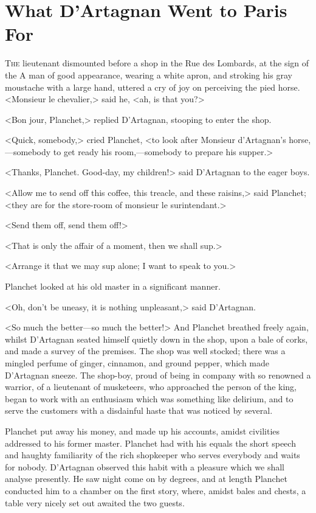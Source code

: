 \chapter{What D'Artagnan Went to Paris For}

\lettrine{T}{he} lieutenant dismounted before a shop in the Rue des Lombards, at the sign of the  A man of good appearance, wearing a white apron, and stroking his gray moustache with a large hand, uttered a cry of joy on perceiving the pied horse. <Monsieur le chevalier,> said he, <ah, is that you?>

<Bon jour, Planchet,> replied D'Artagnan, stooping to enter the shop.

<Quick, somebody,> cried Planchet, <to look after Monsieur d'Artagnan's horse,—somebody to get ready his room,—somebody to prepare his supper.>

<Thanks, Planchet. Good-day, my children!> said D'Artagnan to the eager boys.

<Allow me to send off this coffee, this treacle, and these raisins,> said Planchet; <they are for the store-room of monsieur le surintendant.>

<Send them off, send them off!>

<That is only the affair of a moment, then we shall sup.>

<Arrange it that we may sup alone; I want to speak to you.>

Planchet looked at his old master in a significant manner.

<Oh, don't be uneasy, it is nothing unpleasant,> said D'Artagnan.

<So much the better—so much the better!> And Planchet breathed freely again, whilst D'Artagnan seated himself quietly down in the shop, upon a bale of corks, and made a survey of the premises. The shop was well stocked; there was a mingled perfume of ginger, cinnamon, and ground pepper, which made D'Artagnan sneeze. The shop-boy, proud of being in company with so renowned a warrior, of a lieutenant of musketeers, who approached the person of the king, began to work with an enthusiasm which was something like delirium, and to serve the customers with a disdainful haste that was noticed by several.

Planchet put away his money, and made up his accounts, amidst civilities addressed to his former master. Planchet had with his equals the short speech and haughty familiarity of the rich shopkeeper who serves everybody and waits for nobody. D'Artagnan observed this habit with a pleasure which we shall analyse presently. He saw night come on by degrees, and at length Planchet conducted him to a chamber on the first story, where, amidst bales and chests, a table very nicely set out awaited the two guests.

